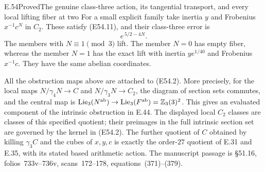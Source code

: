 \begin{statement}{E.54}{Proved}{The genuine class-three action, its tangential transport, and every local lifting fiber at two}
For a small explicit family take inertia $y$ and Frobenius
$x^{-1}c^N$ in $C_2$. These satisfy (E54.11), and their
class-three error is
\[
                 e^{\,5/2-4N}.
 \tag{E54.15}
\]
The members with $N\equiv1\pmod3$ lift. The member $N=0$
has empty fiber, whereas the member $N=1$ has the exact lift
with inertia $y e^{1/40}$ and Frobenius $x^{-1}c$.
They have the same abelian coordinates.

All the obstruction maps above are attached to (E54.2).
More precisely, for the local maps
$N/\gamma_4N\to C$ and $N/\gamma_3N\to C_2$, the diagram
of section sets commutes, and the central map is
$\operatorname{Lie}_3(N^{\rm ab})\to
 \operatorname{Lie}_3(F^{\rm ab})=\mathbb Z_3(3)^2$.
This gives an evaluated component of the intrinsic obstruction
in E.44. The displayed local $C_2$ classes are classes of this
specified quotient; their preimages in the full intrinsic
section set are governed by the kernel in (E54.2).
The further quotient of $C$ obtained by killing $\gamma_3C$
and the cubes of $x,y,c$ is exactly the order-$27$ quotient
of E.31 and E.35, with its stated based arithmetic action.
The manuscript passage is \S51.16, folios~733v--736v,
scans~172--178, equations~(371)--(379).
\end{statement}

